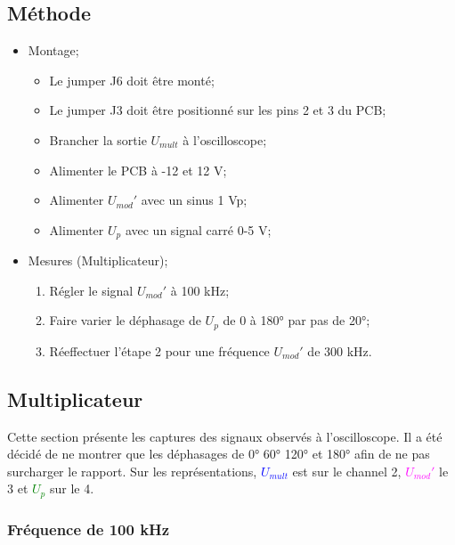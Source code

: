 \subsection{Méthode}


\begin{itemize}
    \item Montage;
    \begin{itemize}
        \item Le jumper J6 doit être monté;
        \item Le jumper J3 doit être positionné sur les pins 2 et 3 du PCB;
        \item Brancher la sortie $U_{mult}$ à l'oscilloscope;
        \item Alimenter le PCB à -12 et 12 V;
        \item Alimenter $U_{mod}'$ avec un sinus 1 Vp;
        \item Alimenter $U_{p}$ avec un signal carré 0-5 V;
    \end{itemize}


    \item Mesures (Multiplicateur);
    \begin{enumerate}
        \item Régler le signal $U_{mod}'$ à 100 kHz;
        \item Faire varier le déphasage de $U_{p}$ de 0 à 180° par pas de 20°;
        \item Réeffectuer l'étape 2 pour une fréquence  $U_{mod}'$ de 300 kHz.
    \end{enumerate}

\end{itemize}

\subsection{Multiplicateur}

Cette section présente les captures des signaux observés à l'oscilloscope. Il a été décidé de
ne montrer que les déphasages de 0° 60° 120° et 180° afin de ne pas surcharger le rapport.
 Sur les représentations, \textcolor{blue}{$U_{mult}$} est sur le channel 2, 
 \textcolor{magenta}{$U_{mod}'$} le 3 et \textcolor{green}{$U_{p}$} sur le 4. 

\subsubsection{Fréquence de 100 kHz}

